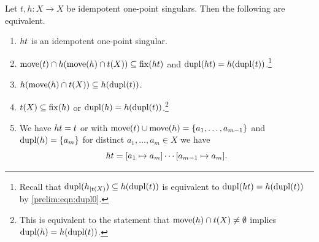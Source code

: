 \begin{proposition} \label{prelim:trans:idempt-one-point:prop:comp} 
	Let $t, h \colon X \to X$ be idempotent one-point singulars. Then the following are equivalent.
	\begin{enumerate}
		\item \label{prelim:trans:idempt-one-point:prop:comp:1} $\concat{t}{h}$ is an idempotent one-point singular.
			
		\item \label{prelim:trans:idempt-one-point:prop:comp:2a} 
		$\move{t} \cap h(\move{h} \cap t(X)) \subseteq \fix{\concat{t}{h}}$
		and 
		$\dupl{\concat{t}{h}} = h(\dupl{t})$.\footnote{Recall that
			$\dupl{h_{|t(X)}} \subseteq h(\dupl{t})$ is equivalent to $\dupl{\concat{t}{h}} = h(\dupl{t})$
			by \cref{prelim:eqn:dupl0}.}
		
		\item \label{prelim:trans:idempt-one-point:prop:comp:2} $h(\move{h} \cap t(X)) \subseteq h(\dupl{t})$.
				
		\item \label{prelim:trans:idempt-one-point:prop:comp:3} $t(X) \subseteq \fix{h}$ or $\dupl{h} = h(\dupl{t})$.\footnote{This is equivalent to the statement that $\move{h} \cap t(X) \ne \emptyset$ implies $\dupl{h} = h(\dupl{t})$.}
	    
	    \item \label{prelim:trans:idempt-one-point:prop:comp:4} We have $\concat{t}{h} = t$
	    or with $\move{t} \cup \move{h} = \{a_1, \ldots, a_{m-1}\}$ and $\dupl{h} = \{a_m\}$
	    for distinct $a_1, \ldots, a_m \in X$
	    we have
	    \[
	    \concat{t}{h} = [a_1 \mapsto a_m] \cdots [a_{m-1} \mapsto a_m].
	    \]
\end{enumerate}	
\end{proposition}
